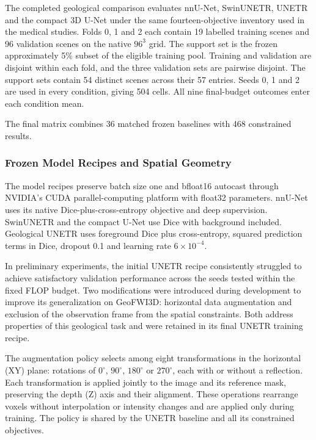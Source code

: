 \documentclass[12pt,a4paper]{article}
\begin{document}
The completed geological comparison evaluates nnU-Net, SwinUNETR,
UNETR and the compact 3D U-Net under the same fourteen-objective
inventory used in the medical studies. Folds 0, 1 and 2 each contain
19 labelled training scenes and 96 validation scenes on the native
$96^3$ grid. The support set is the frozen approximately 5\% subset
of the eligible training pool. Training and validation are disjoint
within each fold, and the three validation sets are pairwise disjoint.
The support sets contain 54 distinct scenes across their 57 entries.
Seeds 0, 1 and 2 are used in every condition, giving 504 cells.
All nine final-budget outcomes enter each condition mean.

The final matrix combines 36 matched frozen baselines with 468
constrained results. 

\subsubsection{Frozen Model Recipes and Spatial Geometry}

The model recipes preserve batch size one and bfloat16 autocast through
NVIDIA's CUDA parallel-computing platform
with float32 parameters. nnU-Net uses its native Dice-plus-cross-entropy
objective and deep supervision. SwinUNETR and the compact U-Net use
Dice with background included. Geological UNETR uses foreground
Dice plus cross-entropy, squared prediction terms in Dice, dropout
0.1 and learning rate $6\times10^{-4}$.

In preliminary experiments, the initial UNETR recipe consistently struggled
to achieve satisfactory validation performance across the seeds tested
within the fixed FLOP budget. Two modifications were introduced during
development to improve its generalization on GeoFWI3D: horizontal data
augmentation and exclusion of the observation frame from the spatial
constraints. Both address properties of this geological task and were
retained in its final UNETR training recipe.

The augmentation policy selects among eight transformations in the
horizontal (XY) plane: rotations of $0^\circ$, $90^\circ$, $180^\circ$
or $270^\circ$, each with or without a reflection. Each transformation
is applied jointly to the image and its reference mask, preserving the
depth (Z) axis and their alignment. These operations rearrange voxels
without interpolation or intensity changes and are applied only during
training. The policy is shared by the UNETR baseline and all its
constrained objectives.
\end{document}
